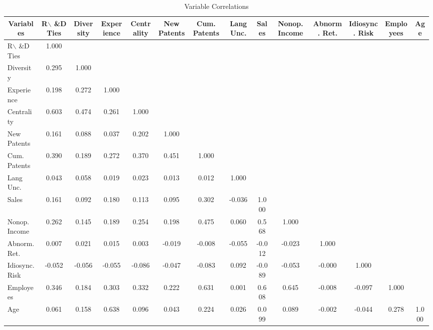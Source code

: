 \begin{table}[htbp]\centering \caption{Variable Correlations\label{corrtable}}
\begin{tabular}{l  c  c  c  c  c  c  c  c  c  c  c  c  c }\hline\hline
\multicolumn{1}{c}{Variables} &R$\backslash$ \&D Ties&Diversity&Experience&Centrality&New Patents&Cum. Patents&Lang Unc.&Sales&Nonop. Income&Abnorm. Ret.&Idiosync. Risk&Employees&Age\\ \hline
R$\backslash$ \&D Ties&1.000\\
Diversity&0.295&1.000\\
Experience&0.198&0.272&1.000\\
Centrality&0.603&0.474&0.261&1.000\\
New Patents&0.161&0.088&0.037&0.202&1.000\\
Cum. Patents&0.390&0.189&0.272&0.370&0.451&1.000\\
Lang Unc.&0.043&0.058&0.019&0.023&0.013&0.012&1.000\\
Sales&0.161&0.092&0.180&0.113&0.095&0.302&-0.036&1.000\\
Nonop. Income&0.262&0.145&0.189&0.254&0.198&0.475&0.060&0.568&1.000\\
Abnorm. Ret.&0.007&0.021&0.015&0.003&-0.019&-0.008&-0.055&-0.012&-0.023&1.000\\
Idiosync. Risk&-0.052&-0.056&-0.055&-0.086&-0.047&-0.083&0.092&-0.089&-0.053&-0.000&1.000\\
Employees&0.346&0.184&0.303&0.332&0.222&0.631&0.001&0.608&0.645&-0.008&-0.097&1.000\\
Age&0.061&0.158&0.638&0.096&0.043&0.224&0.026&0.099&0.089&-0.002&-0.044&0.278&1.000\\
\hline \hline 
 \end{tabular}
\end{table}
